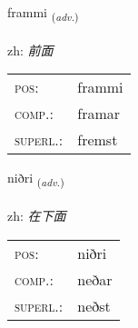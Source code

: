 \documentclass[frontgrid, backgrid]{flacards}\usepackage[]{graphicx}\usepackage[]{color}
\begin{document}
\renewcommand{\blhead}{\vskip5pt {\small\bfseries\footnotesize Atviksorð | 副词 }}
\renewcommand{\bcfoot}{\vskip5pt \hspace{2pt}{\small\bfseries\footnotesize 2K}}


{frammi \small{\textsubscript{(\textit{adv.})}} \\[1ex] %
\textphonetic{[framɪ]} \\
zh: \emph{前面} \\  [2ex]
\renewcommand*{\arraystretch}{0.8}
\begin{tabular}{ll}
\textsc{pos}: & frammi \\ 
\textsc{comp.}: & framar \\ 
\textsc{superl.}: & fremst \\
\end{tabular}
}

\renewcommand{\flhead}{\vskip5pt \fboxsep=0pt {\small\bfseries\footnotesize Atviksorð | 副词}}
\renewcommand{\fcfoot}{\vskip5pt \fboxsep=0pt \hspace{2pt}{\small\bfseries\footnotesize 2K}}

\renewcommand{\blhead}{\vskip5pt {\small\bfseries\footnotesize Atviksorð | 副词 }}
\renewcommand{\bcfoot}{\vskip5pt \hspace{2pt}{\small\bfseries\footnotesize 2K}}


{niðri \small{\textsubscript{(\textit{adv.})}} \\[1ex] %
\textphonetic{[nɪðrɪ]} \\
zh: \emph{在下面} \\  [2ex]
\renewcommand*{\arraystretch}{0.8}
\begin{tabular}{ll}
\textsc{pos}: & niðri \\ 
\textsc{comp.}: & neðar \\ 
\textsc{superl.}: & neðst \\
\end{tabular}
}

\renewcommand{\flhead}{\vskip5pt \fboxsep=0pt {\small\bfseries\footnotesize Atviksorð | 副词}}
\renewcommand{\fcfoot}{\vskip5pt \fboxsep=0pt \hspace{2pt}{\small\bfseries\footnotesize 2K}}
\end{document}
